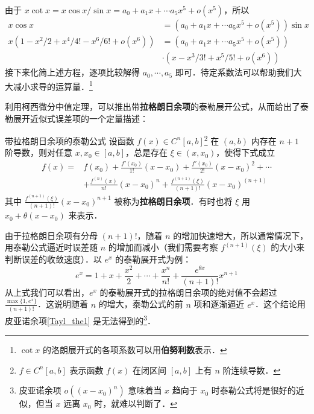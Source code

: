 由于 $x\cot x=x\cos x/\sin x=a_0+a_1 x+\cdots a_5 x^5+o(x^5)$，所以
\begin{equation}
\begin{aligned}
x\cos x&=(a_0+a_1 x+\cdots a_5 x^5+o(x^5))\sin x\\
x(1-x^2/2+x^4/4!-x^6/6!+o(x^6))&=(a_0+a_1 x+\cdots a_5 x^5+o(x^5))\\
&\cdot (x-x^3/3!+x^5/5!+o(x^6))
\end{aligned}
\end{equation}
接下来化简上述方程，逐项比较解得 $a_0,\cdots,a_5$ 即可．待定系数法可以帮助我们大大减小求导的运算量．\footnote{$\cot x$ 的洛朗展开式的各项系数可以用\textbf{伯努利数}表示．}

利用柯西微分中值定理，可以推出带\textbf{拉格朗日余项}的泰勒展开公式，从而给出了泰勒展开近似式误差项的一个定量描述：
\begin{theorem}{带拉格朗日余项的泰勒公式}
设函数 $f(x)\in C^n[a,b]$\footnote{$f\in C^n[a,b]$ 表示函数 $f(x)$ 在闭区间 $[a,b]$ 上有 $n$ 阶连续导数．} 在 $(a,b)$ 内存在 $n+1$ 阶导数，则对任意 $x,x_0\in [a,b]$，总是存在 $\xi\in (x,x_0)$，使得下式成立
\begin{equation}
\begin{aligned}
f(x)=&f(x_0)+\frac{f'(x_0)}{1!}(x-x_0)+\frac{f'(x_0)}{2!}(x-x_0)^2+\cdots\\
&+\frac{f^{(n)}(x)}{n!}(x-x_0)^n+\frac{f^{(n+1)}(\xi)}{(n+1)!}(x-x_0)^{(n+1)}
\end{aligned}
\end{equation}
其中 $\frac{f^{(n+1)}(\xi)}{(n+1)!}(x-x_0)^{n+1}$ 被称为\textbf{拉格朗日余项}．有时也将 $\xi$ 用 $x_0+\theta(x-x_0)$ 来表示．
\end{theorem}

由于拉格朗日余项有分母 $(n+1)!$，随着 $n$ 的增加快速增大，所以通常情况下，用泰勒公式逼近时误差随 $n$ 的增加而减小（我们需要考察 $f^{(n+1)}(\xi)$ 的大小来判断误差的收敛速度）．以 $e^x$ 的泰勒展开式为例：
\begin{equation}
e^x=1+x+\frac{x^2}{2}+\cdots+\frac{x^n}{n!}+\frac{e^{\theta x}}{(n+1)!}x^{n+1}
\end{equation}
从上式我们可以看出，$e^x$ 的泰勒展开式的拉格朗日余项的绝对值不会超过 $\frac{\max\{1,e^x\}}{(n+1)!}$．这说明随着 $n$ 的增大，泰勒公式的前 $n$ 项和逐渐逼近 $e^x$．这个结论用皮亚诺余项\autoref{Tayl_the1} 是无法得到的\footnote{皮亚诺余项 $o((x-x_0)^n)$ 意味着当 $x$ 趋向于 $x_0$ 时泰勒公式将是很好的近似，但当 $x$ 远离 $x_0$ 时，就难以判断了．}．

